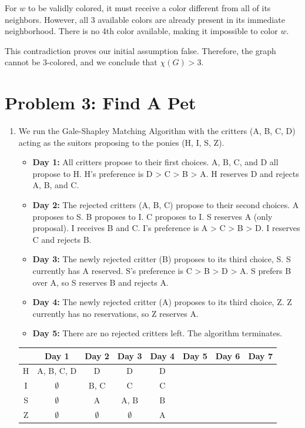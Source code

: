 \documentclass[11pt]{article}
\begin{document}
\begin{enumerate}[label=\textbf{(\alph*)}]
For $w$ to be validly colored, it must receive a color different from all of its neighbors. However, all 3 available colors are already present in its immediate neighborhood. There is no 4th color available, making it impossible to color $w$. 

This contradiction proves our initial assumption false. Therefore, the graph cannot be 3-colored, and we conclude that $\chi(G) > 3$.
\end{enumerate}

\section*{Problem 3: Find A Pet}
\begin{enumerate}[label=\textbf{(\alph*)}]
    \item We run the Gale-Shapley Matching Algorithm with the critters (A, B, C, D) acting as the suitors proposing to the ponies (H, I, S, Z).
    
    \begin{itemize}
        \item \textbf{Day 1:} All critters propose to their first choices. A, B, C, and D all propose to H. H's preference is D > C > B > A. H reserves D and rejects A, B, and C.
        \item \textbf{Day 2:} The rejected critters (A, B, C) propose to their second choices. A proposes to S. B proposes to I. C proposes to I. S reserves A (only proposal). I receives B and C. I's preference is A > C > B > D. I reserves C and rejects B.
        \item \textbf{Day 3:} The newly rejected critter (B) proposes to its third choice, S. S currently has A reserved. S's preference is C > B > D > A. S prefers B over A, so S reserves B and rejects A.
        \item \textbf{Day 4:} The newly rejected critter (A) proposes to its third choice, Z. Z currently has no reservations, so Z reserves A.
        \item \textbf{Day 5:} There are no rejected critters left. The algorithm terminates.
    \end{itemize}

    \begin{center}
    \renewcommand{\arraystretch}{1.5}
    \begin{tabular}{|c||c|c|c|c|c|c|c|}
    \hline
     & Day 1 & Day 2 & Day 3 & Day 4 & Day 5 & Day 6 & Day 7 \\
    \hline\hline
    H & A, B, C, $\boxed{\text{D}}$ & $\boxed{\text{D}}$ & $\boxed{\text{D}}$ & $\boxed{\text{D}}$ & & & \\
    \hline
    I & $\emptyset$ & B, $\boxed{\text{C}}$ & $\boxed{\text{C}}$ & $\boxed{\text{C}}$ & & & \\
    \hline
    S & $\emptyset$ & $\boxed{\text{A}}$ & A, $\boxed{\text{B}}$ & $\boxed{\text{B}}$ & & & \\
    \hline
    Z & $\emptyset$ & $\emptyset$ & $\emptyset$ & $\boxed{\text{A}}$ & & & \\
    \hline
    \end{tabular}
    \end{center}


\end{enumerate}
\end{document}

